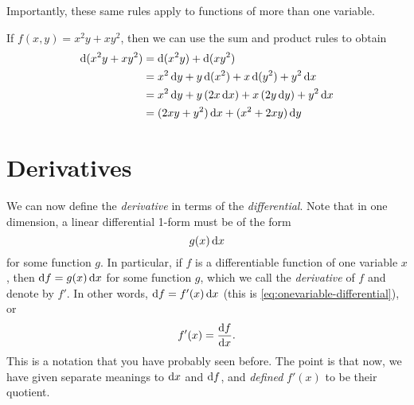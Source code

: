 \documentclass[12pt]{amsart}
\begin{document}
Importantly, these same rules apply to functions of more than one variable.

\begin{eg}
  If $f(x,y) = x^2y + xy^2$, then we can use the sum and product rules to obtain
  \begin{align*}
    \mathrm{d}(x^2y + xy^2) &= \mathrm{d}(x^2y) + \mathrm{d}(xy^2)\\
    &= x^2\,\mathrm{d} y + y \,\mathrm{d}(x^2) + x \,\mathrm{d}(y^2) + y^2\,\mathrm{d} x\\
    &= x^2\,\mathrm{d} y + y \,(2x\,\mathrm{d} x) + x\, (2y\,\mathrm{d} y) + y^2\,\mathrm{d} x\\
    &= (2xy + y^2)\,\mathrm{d} x + (x^2+2xy)\,\mathrm{d} y
  \end{align*}
\end{eg}

\section{Derivatives}
\label{sec:derivatives}

We can now define the \emph{derivative} in terms of the \emph{differential}.
Note that in one dimension, a linear differential 1-form must be of the form
\[ g(x) \,\mathrm{d} x \]
for some function $g$.
In particular, if $f$ is a differentiable function of one variable $x$, then $\mathrm{d} f = g(x) \, \mathrm{d} x$ for some function $g$, which we call the \emph{derivative} of $f$ and denote by $f'$.
In other words, $\mathrm{d} f = f'(x)\,\mathrm{d} x$ (this is \cref{eq:onevariable-differential}), or
\[ f'(x) = \frac{\mathrm{d} f}{\mathrm{d} x}. \]
This is a notation that you have probably seen before.
The point is that now, we have given separate meanings to $\mathrm{d} x$ and $\mathrm{d} f$, and \emph{defined} $f'(x)$ to be their quotient.
\end{document}
